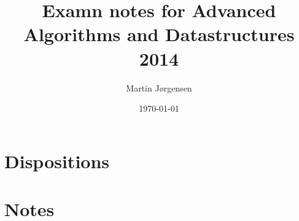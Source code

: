 \documentclass[a4paper,12pt]{article}
\title{Examn notes for Advanced Algorithms and Datastructures 2014}
\author{Martin Jørgensen}
\date{\today}
\begin{document}
\maketitle

\section{Dispositions}




\pagebreak
\section{Notes}

\end{document}
